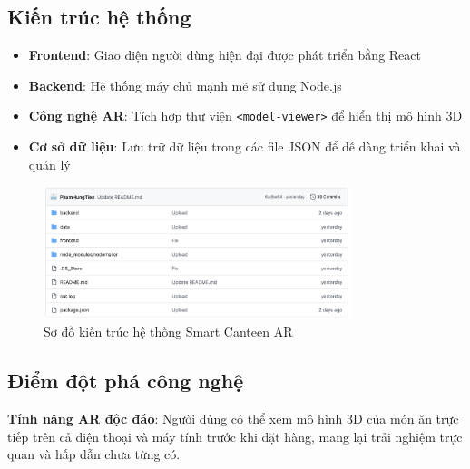 \documentclass[12pt,a4paper]{article}
\begin{document}
\subsection{Kiến trúc hệ thống}
\begin{itemize}[leftmargin=1cm]
    \item \textbf{Frontend}: Giao diện người dùng hiện đại được phát triển bằng React
    \item \textbf{Backend}: Hệ thống máy chủ mạnh mẽ sử dụng Node.js
    \item \textbf{Công nghệ AR}: Tích hợp thư viện \texttt{<model-viewer>} để hiển thị mô hình 3D
    \item \textbf{Cơ sở dữ liệu}: Lưu trữ dữ liệu trong các file JSON để dễ dàng triển khai và quản lý
\end{itemize}

\begin{figure}[H]
    \centering
    \includegraphics[width=0.8\textwidth]{../images/kien_truc_he_thong.png} %
    \caption{Sơ đồ kiến trúc hệ thống Smart Canteen AR}
    \label{fig:kien_truc_he_thong}
\end{figure}

\subsection{Điểm đột phá công nghệ}
\textbf{Tính năng AR độc đáo}: Người dùng có thể xem mô hình 3D của món ăn trực tiếp trên cả điện thoại và máy tính trước khi đặt hàng, mang lại trải nghiệm trực quan và hấp dẫn chưa từng có.
\end{document}
